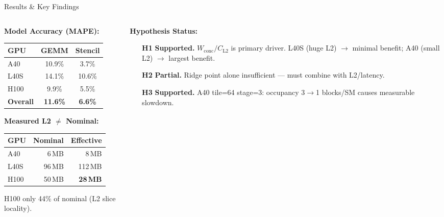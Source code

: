 \documentclass[aspectratio=169,10pt]{beamer}
\begin{document}
\begin{frame}{Results \& Key Findings}

\begin{columns}[T]
\begin{column}{0.38\textwidth}
\textbf{Model Accuracy (MAPE):}

\vspace{0.3em}
\renewcommand{\arraystretch}{1.3}
\begin{table}
\centering
\scriptsize
\begin{tabular}{@{}lcc@{}}
\toprule
\textbf{GPU} & \textbf{GEMM} & \textbf{Stencil} \\
\midrule
\textcolor{gpuA40}{A40}     & 10.9\% & 3.7\% \\
\textcolor{gpuL40S}{L40S}   & 14.1\% & 10.6\% \\
\textcolor{gpuH100}{H100}   & 9.9\% & 5.5\% \\
\midrule
\textbf{Overall} & \textbf{11.6\%} & \textbf{6.6\%} \\
\bottomrule
\end{tabular}
\end{table}

\vspace{0.3em}
\textbf{Measured L2 $\neq$ Nominal:}

\vspace{0.3em}
\renewcommand{\arraystretch}{1.2}
\begin{table}
\centering
\scriptsize
\begin{tabular}{@{}lrr@{}}
\toprule
\textbf{GPU} & \textbf{Nominal} & \textbf{Effective} \\
\midrule
A40  & 6\,MB  & 8\,MB \\
L40S & 96\,MB & 112\,MB \\
H100 & 50\,MB & \textbf{28\,MB} \\
\bottomrule
\end{tabular}
\end{table}

\scriptsize H100 only 44\% of nominal (L2 slice locality).
\end{column}

\begin{column}{0.60\textwidth}
\textbf{Hypothesis Status:}
\begin{itemize}\scriptsize
    \item[\textcolor{green!60!black}{\textbf{H1}}] \textbf{Supported.} $W_{\text{conc}}/C_{\text{L2}}$ is primary driver. L40S (huge L2) $\to$ minimal benefit; A40 (small L2) $\to$ largest benefit.
    \item[\textcolor{yellow!60!black}{\textbf{H2}}] \textbf{Partial.} Ridge point alone insufficient --- must combine with L2/latency.
    \item[\textcolor{green!60!black}{\textbf{H3}}] \textbf{Supported.} A40 tile=64 stage=3: occupancy 3$\to$1 blocks/SM causes measurable slowdown.
\end{itemize}


\end{column}
\end{columns}
\end{frame}
\end{document}

